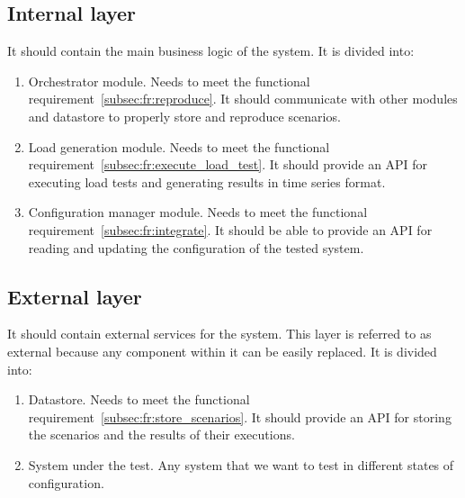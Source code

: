 \subsection{Internal layer}\label{subsec:internal_layer}
It should contain the main business logic of the system. It is divided into:
\begin{enumerate}
    \item Orchestrator module. Needs to meet the functional requirement~\ref{subsec:fr:reproduce}. It should communicate with other modules and datastore to properly store and reproduce scenarios.
    \item Load generation module. Needs to meet the functional requirement~\ref{subsec:fr:execute_load_test}. It should provide an API for executing load tests and generating results in time series format.
    \item Configuration manager module. Needs to meet the functional requirement~\ref{subsec:fr:integrate}. It should be able to provide an API for reading and updating the configuration of the tested system.
\end{enumerate}

\subsection{External layer}\label{subsec:external_layer}
It should contain external services for the system. This layer is referred to as external because any component within it can be easily replaced. It is divided into:
\begin{enumerate}
    \item Datastore. Needs to meet the functional requirement~\ref{subsec:fr:store_scenarios}. It should provide an API for storing the scenarios and the results of their executions.
    \item System under the test. Any system that we want to test in different states of configuration.
\end{enumerate}